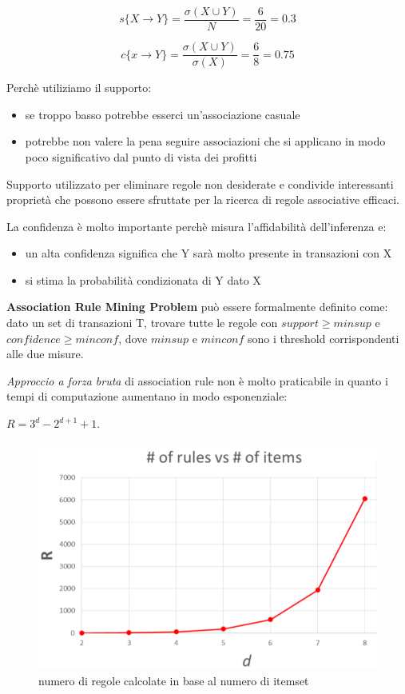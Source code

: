\[s\{X \rightarrow Y\} = \frac{\sigma(X \cup Y)}{N} = \frac{6}{20} = 0.3\]

\[c\{x \rightarrow Y\} = \frac{\sigma(X \cup Y)}{\sigma(X)} = \frac{6}{8} = 0.75\]

Perch\`e utiliziamo il supporto:
\begin{itemize}
	\item se troppo basso potrebbe esserci un'associazione casuale
	\item potrebbe non valere la pena seguire associazioni che si applicano in modo poco significativo dal punto di vista dei profitti 
\end{itemize}
Supporto utilizzato per eliminare regole non desiderate e condivide interessanti propriet\`a che possono essere sfruttate per la ricerca di regole associative efficaci.

La confidenza \`e molto importante perch\`e misura l'affidabilità dell'inferenza e:
\begin{itemize}
	\item un alta confidenza significa che Y sar\`a molto presente in transazioni con X 
	\item si stima la probabilit\`a condizionata di Y dato X
\end{itemize}
\begin{defn}
\textbf{Association Rule Mining Problem} può essere formalmente definito come: dato un set di transazioni T, trovare tutte le regole con $support \ge minsup$ e $confidence \ge minconf$, dove $minsup$ e $minconf$ sono i threshold corrispondenti alle due misure.
\end{defn}

\textit{Approccio a forza bruta} di association rule non \`e molto praticabile in quanto i tempi di computazione aumentano in modo esponenziale: 

$R = 3^d - 2^{d+1} + 1$.

\begin{figure}[H]
	\centering
	\includegraphics[height=0.4 \linewidth]{association/pict/brute_force.png}
	\caption{numero di regole calcolate in base al numero di itemset}
\end{figure}

